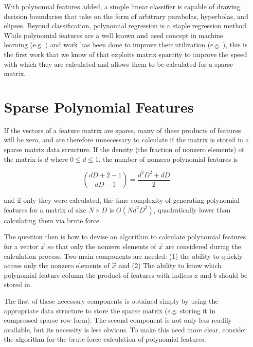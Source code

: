 \documentclass[11pt,twocolumn]{article}
\begin{document}
With polynomial features added, a simple linear classifier is capable of drawing decision boundaries
that take on the form of arbitrary parabolas, hyperbolas, and elipses. Beyond classification, polynomial regression \cite{theoryoflinearmodels} is a staple regression method.
While polynomial features are a well known and used concept in machine learning (e.g. \cite{pavlidis2002learning, konidaris2009skill, wiesler2009investigations}) and work has been done to improve their utilization (e.g. \cite{pevckov2008minimal, huang2010predicting}), this is the first work that we know of that exploits matrix sparcity 
to improve the speed with which they are calculated and allows them to be calculated for a sparse matrix.


\section{Sparse Polynomial Features} \label{sec:sparse}
If the vectors of a feature matrix are sparse, many of these products of features will be
zero, and are therefore unnecessary to calculate if the matrix is stored in a sparse matrix 
data structure. If the density (the fraction of nonzero elements) of the matrix is $d$ where $0 \le d \le 1$,
the number of nonzero polynomial features is

\begin{equation*}
\binom{dD+2-1}{dD-1} = \frac{d^2D^2+dD}{2}
\end{equation*}

and if only they were calculated, the time complexity of generating polynomial features
for a matrix of size $N \times D$ is $O(Nd^2D^2)$, quadratically lower than calculating them via brute force.

The question then is how to devise an algorithm to calculate polynomial features for a vector $\vec{x}$ so that
only the nonzero elements of $\vec{x}$ are considered during the calculation process. Two main components are needed: (1) the ability to
quickly access only the nonzero elements of $\vec{x}$ and (2) The ability to know which polynomial feature column
the product of features with indices $a$ and $b$ should be stored in.

The first of these necessary components is obtained simply by using the appropriate data structure
to store the sparse matrix (e.g. storing it in compressed sparse row form). The second component 
is not only less readily available, but its necessity is less obvious. To make this need more clear, consider the
algorithm for the brute force calculation of polynomial features:
\end{document}
